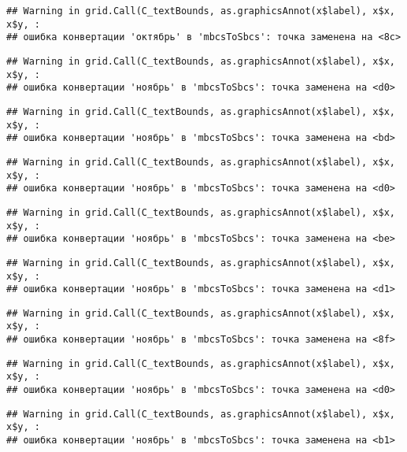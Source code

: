 \documentclass[
]{article}
\begin{document}
\begin{verbatim}
## Warning in grid.Call(C_textBounds, as.graphicsAnnot(x$label), x$x, x$y, :
## ошибка конвертации 'октябрь' в 'mbcsToSbcs': точка заменена на <8c>
\end{verbatim}

\begin{verbatim}
## Warning in grid.Call(C_textBounds, as.graphicsAnnot(x$label), x$x, x$y, :
## ошибка конвертации 'ноябрь' в 'mbcsToSbcs': точка заменена на <d0>
\end{verbatim}

\begin{verbatim}
## Warning in grid.Call(C_textBounds, as.graphicsAnnot(x$label), x$x, x$y, :
## ошибка конвертации 'ноябрь' в 'mbcsToSbcs': точка заменена на <bd>
\end{verbatim}

\begin{verbatim}
## Warning in grid.Call(C_textBounds, as.graphicsAnnot(x$label), x$x, x$y, :
## ошибка конвертации 'ноябрь' в 'mbcsToSbcs': точка заменена на <d0>
\end{verbatim}

\begin{verbatim}
## Warning in grid.Call(C_textBounds, as.graphicsAnnot(x$label), x$x, x$y, :
## ошибка конвертации 'ноябрь' в 'mbcsToSbcs': точка заменена на <be>
\end{verbatim}

\begin{verbatim}
## Warning in grid.Call(C_textBounds, as.graphicsAnnot(x$label), x$x, x$y, :
## ошибка конвертации 'ноябрь' в 'mbcsToSbcs': точка заменена на <d1>
\end{verbatim}

\begin{verbatim}
## Warning in grid.Call(C_textBounds, as.graphicsAnnot(x$label), x$x, x$y, :
## ошибка конвертации 'ноябрь' в 'mbcsToSbcs': точка заменена на <8f>
\end{verbatim}

\begin{verbatim}
## Warning in grid.Call(C_textBounds, as.graphicsAnnot(x$label), x$x, x$y, :
## ошибка конвертации 'ноябрь' в 'mbcsToSbcs': точка заменена на <d0>
\end{verbatim}

\begin{verbatim}
## Warning in grid.Call(C_textBounds, as.graphicsAnnot(x$label), x$x, x$y, :
## ошибка конвертации 'ноябрь' в 'mbcsToSbcs': точка заменена на <b1>
\end{verbatim}
\end{document}
